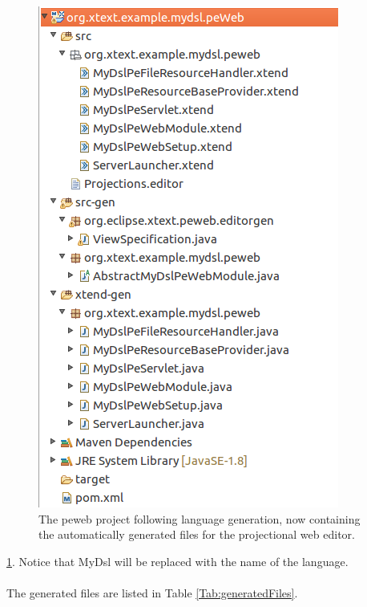 \documentclass{article}
\begin{document}
\begin{figure}[h!]
  \centering
  \includegraphics[width=0.4\linewidth]{./Screenshots/peWebProjectContentsAfterGeneration.png}
  \caption{The peweb project following language generation, now containing the automatically generated files for the projectional web editor.}
  \label{fig:generatedPeWebProject}
\end{figure} \ref{fig:generatedPeWebProject}. Notice that MyDsl will be replaced with the name of the language.
\\
\\
The generated files are listed in Table \ref{Tab:generatedFiles}.
\end{document}
